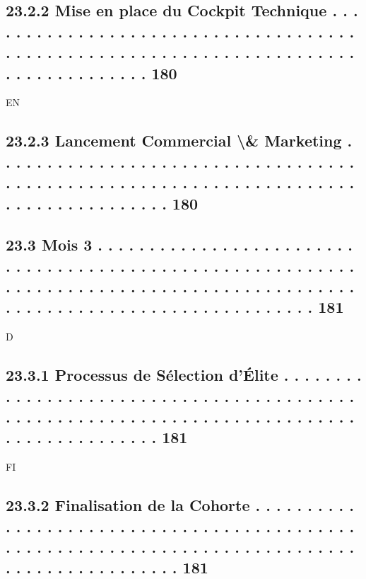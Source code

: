 \subsection{23.2.2               Mise en place du Cockpit Technique . . . . . . . . . . . . . . . . . . . . . . . . . . . . . . . . . . . . . . . . . . . . . . . . . . . . . . . . . . . . . . . . . . . . . . . . . . . . . . . . . . . . . 180}
\vspace{0.5em}
\vspace{0.5em}
\vspace{0.5em}
\vspace{0.5em}
EN\\
\subsection{23.2.3               Lancement Commercial \textbackslash{}& Marketing . . . . . . . . . . . . . . . . . . . . . . . . . . . . . . . . . . . . . . . . . . . . . . . . . . . . . . . . . . . . . . . . . . . . . . . . . . . . . . . . . . . . . 180}
\subsection{23.3    Mois 3 . . . . . . . . . . . . . . . . . . . . . . . . . . . . . . . . . . . . . . . . . . . . . . . . . . . . . . . . . . . . . . . . . . . . . . . . . . . . . . . . . . . . . . . . . . . . . . . . . . . . . . . . . . . . . . . . . . . . . . . . . . . 181}
\vspace{0.5em}
\vspace{0.5em}
\vspace{0.5em}
\vspace{0.5em}
D\\
\subsection{23.3.1               Processus de Sélection d’Élite . . . . . . . . . . . . . . . . . . . . . . . . . . . . . . . . . . . . . . . . . . . . . . . . . . . . . . . . . . . . . . . . . . . . . . . . . . . . . . . . . . . . . . . . . . . 181}
\vspace{0.5em}
\vspace{0.5em}
\vspace{0.5em}
\vspace{0.5em}
FI\\
\subsection{23.3.2               Finalisation de la Cohorte . . . . . . . . . . . . . . . . . . . . . . . . . . . . . . . . . . . . . . . . . . . . . . . . . . . . . . . . . . . . . . . . . . . . . . . . . . . . . . . . . . . . . . . . . . . . . . . 181}
